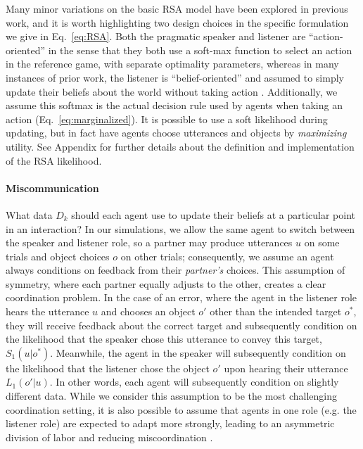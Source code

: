 Many minor variations on the basic RSA model have been explored in previous work, and it is worth highlighting two design choices in the specific formulation we give in Eq.~\ref{eq:RSA}. 
Both the pragmatic speaker and listener are ``action-oriented'' in the sense that they both use a soft-max function to select an action in the reference game, with separate optimality parameters, whereas in many instances of prior work, the listener is ``belief-oriented'' and assumed to simply update their beliefs about the world without taking action \cite{qing2015variations}.
Additionally, we assume this softmax is the actual decision rule used by agents when taking an action (Eq.~\ref{eq:marginalized}).
It is possible to use a soft likelihood during updating, but in fact have agents choose utterances and objects by \emph{maximizing} utility. 
See Appendix for further details about the definition and implementation of the RSA likelihood.

\paragraph{Miscommunication}

What data $D_k$ should each agent use to update their beliefs at a particular point in an interaction?
In our simulations, we allow the same agent to switch between the speaker and listener role, so a partner may produce utterances $u$ on some trials and object choices $o$ on other trials; consequently, we assume an agent always conditions on feedback from their \emph{partner's} choices.
This assumption of symmetry, where each partner equally adjusts to the other, creates a clear coordination problem. 
In the case of an error, where the agent in the listener role hears the utterance $u$ and chooses an object $o'$ other than the intended target $o^*$, they will receive feedback about the correct target and subsequently condition on the likelihood that the speaker chose this utterance to convey this target, $S_1(u | o^*)$. 
Meanwhile, the agent in the speaker will subsequently condition on the likelihood that the listener chose the object $o'$ upon hearing their utterance $L_1(o' | u)$.
In other words, each agent will subsequently condition on slightly different data.
While we consider this assumption to be the most challenging coordination setting, it is also possible to assume that agents in one role (e.g. the listener role) are expected to adapt more strongly, leading to an asymmetric division of labor and reducing miscoordination \cite{MorenoBaggio14_AsymmetrySignaling}.

